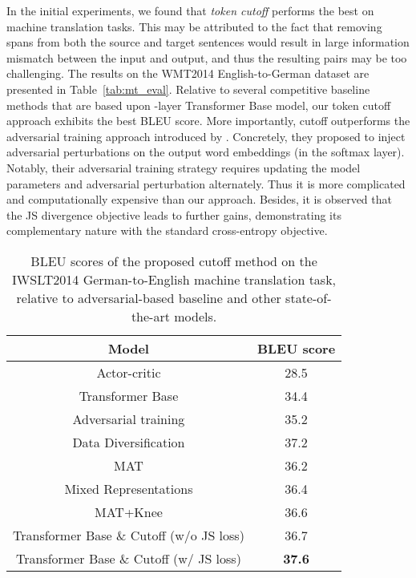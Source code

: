 \documentclass[11pt,a4paper]{article}
\newcommand{\tf}[1]{\textbf{#1}}
\begin{document}
In the initial experiments, we found that \emph{token cutoff} performs the best on machine translation tasks. This may be attributed to the fact that removing spans from both the source and target sentences would result in large information mismatch between the input and output, and thus the resulting pairs may be too challenging. The results on the WMT2014 English-to-German dataset are presented in Table~\ref{tab:mt_eval}. Relative to several competitive baseline methods that are based upon -layer Transformer Base model, our token cutoff approach exhibits the best BLEU score. More importantly, cutoff outperforms the adversarial training approach introduced by \cite{Wang2019ImprovingNL}. Concretely, they proposed to inject adversarial perturbations on the output word embeddings (in the softmax layer). Notably, their adversarial training strategy requires updating the model parameters and adversarial perturbation alternately. Thus it is more complicated and computationally expensive than our approach. Besides, it is observed that the JS divergence objective leads to further gains, demonstrating its complementary nature with the standard cross-entropy objective.
\begin{table}[ht!]
	\centering
	\begin{small}
		\vspace{0mm}
		\setlength{\tabcolsep}{6pt}
		\def\arraystretch{1.18}
		\begin{tabular}{c||c}
			\toprule[1.2pt]
			\tf{Model} & \tf{BLEU score} \\
			\hline
			Actor-critic \cite{bahdanau2016actor} & 28.5 \\
			Transformer Base \cite{vaswani2017attention} & 34.4 \\
			Adversarial training \cite{Wang2019ImprovingNL} & 35.2 \\
			Data Diversification \cite{Nguyen2019DataDA} & 37.2 \\
			MAT \cite{fan2020multi} & 36.2 \\
			Mixed Representations \cite{wu2020sequence} & 36.4 \\
			MAT+Knee \cite{iyer2020wide} & 36.6 \\
			\hline
			Transformer Base \& Cutoff (w/o  JS loss) & 36.7 \\
    		Transformer Base \& Cutoff (w/  JS loss) & \textbf{37.6} \\
			\bottomrule[1.2pt]
		\end{tabular}\caption{BLEU scores of the proposed cutoff method on the IWSLT2014 German-to-English machine translation task, relative to adversarial-based baseline and other state-of-the-art models.}
		\label{tab:mt_eval_2}
	\end{small}
	\vspace{-2mm}
\end{table}
\end{document}
